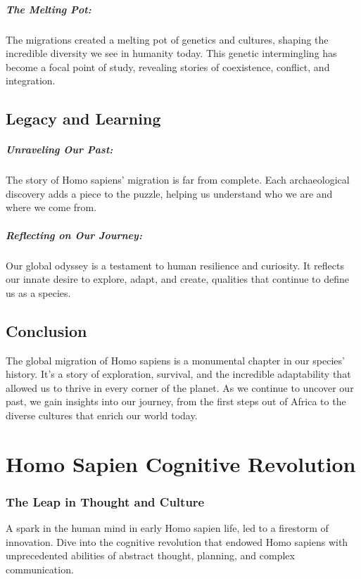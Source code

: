 \documentclass[a4paper,12pt]{book}
\begin{document}
\paragraph{The Melting Pot:}
The migrations created a melting pot of genetics and cultures, shaping the incredible diversity we see in humanity today. This genetic intermingling has become a focal point of study, revealing stories of coexistence, conflict, and integration.

\section*{Legacy and Learning}

\paragraph{Unraveling Our Past:}
The story of Homo sapiens’ migration is far from complete. Each archaeological discovery adds a piece to the puzzle, helping us understand who we are and where we come from.

\paragraph{Reflecting on Our Journey:}
Our global odyssey is a testament to human resilience and curiosity. It reflects our innate desire to explore, adapt, and create, qualities that continue to define us as a species.

\section*{Conclusion}

The global migration of Homo sapiens is a monumental chapter in our species’ history. It’s a story of exploration, survival, and the incredible adaptability that allowed us to thrive in every corner of the planet. As we continue to uncover our past, we gain insights into our journey, from the first steps out of Africa to the diverse cultures that enrich our world today.

\chapter{Homo Sapien Cognitive Revolution}
\subsection*{The Leap in Thought and Culture}
A spark in the human mind in early Homo sapien life, led to a firestorm of innovation. Dive into the cognitive revolution that endowed Homo sapiens with unprecedented abilities of abstract thought, planning, and complex communication.
\end{document}
